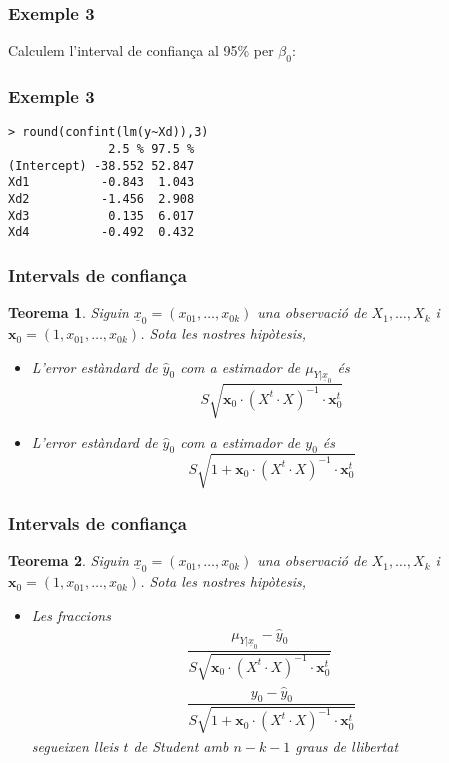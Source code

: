 \documentclass[12pt,t]{beamer}
\theoremstyle{plain}
\newtheorem{teorema}{Teorema}
\theoremstyle{definition}
\begin{document}
\begin{frame}
\frametitle{Exemple 3}
Calculem l'interval de confiança al 95\% per $\beta_0$:
\end{frame}


\begin{frame}[fragile]
\frametitle{Exemple 3}
\begin{verbatim}
> round(confint(lm(y~Xd)),3)
              2.5 % 97.5 %
(Intercept) -38.552 52.847
Xd1          -0.843  1.043
Xd2          -1.456  2.908
Xd3           0.135  6.017
Xd4          -0.492  0.432
\end{verbatim}

\end{frame}



\begin{frame}
\frametitle{Intervals de confiança}
\begin{teorema}
Siguin $\underline{x}_0=(x_{01},\ldots,x_{0k})$ una observació de $X_1,\ldots,X_k$ i $\mathbf{x}_0=(1,x_{01},\ldots,x_{0k})$. 
Sota les nostres hipòtesis, 
\medskip

\begin{itemize}
\item L'error estàndard de $\widehat{y}_0$ com a estimador de $\mu_{Y|\underline{x}_0}$ és 
$$
S\sqrt{\mathbf{x}_0\cdot  (X^t \cdot  X)^{-1}\cdot \mathbf{x}_0^t}
$$

\item L'error estàndard de $\widehat{y}_0$ com a estimador de $y_0$ és 
$$
S\sqrt{1+\mathbf{x}_0\cdot  (X^t \cdot  X)^{-1}\cdot \mathbf{x}_0^t}
$$
\end{itemize}
\end{teorema}
\end{frame}


\begin{frame}
\frametitle{Intervals de confiança}
\begin{teorema}
Siguin $\underline{x}_0=(x_{01},\ldots,x_{0k})$ una observació de $X_1,\ldots,X_k$ i $\mathbf{x}_0=(1,x_{01},\ldots,x_{0k})$. 
Sota les nostres hipòtesis, 
\medskip

\begin{itemize}
\item Les fraccions 
$$
\begin{array}{l}
\dfrac{\mu_{Y|\underline{x}_0}-\widehat{y}_0}{S\sqrt{\mathbf{x}_0\cdot (X^t \cdot X)^{-1}\cdot \mathbf{x}_0^t}}\\[3ex]
\dfrac{y_0-\widehat{y}_0}{S\sqrt{1+\mathbf{x}_0\cdot  (X^t \cdot X)^{-1}\cdot \mathbf{x}_0^t}}
\end{array}
$$
segueixen lleis $t$ de Student amb $n-k-1$ graus de llibertat
\end{itemize}
\end{teorema}
\end{frame}
\end{document}
